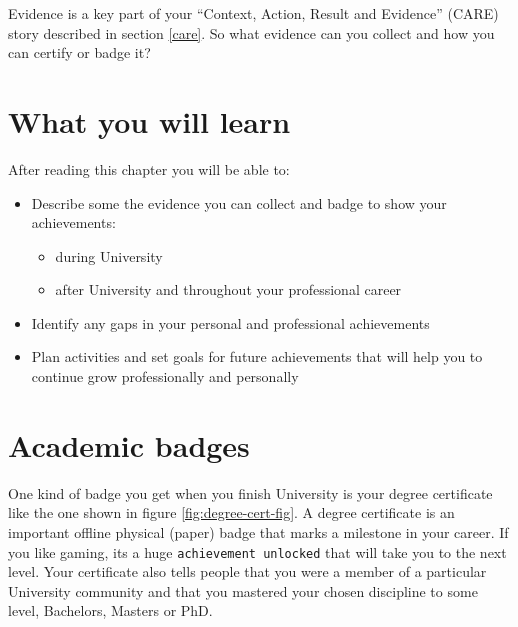 \documentclass[
]{book}
\providecommand{\tightlist}{%
  \setlength{\itemsep}{0pt}\setlength{\parskip}{0pt}}
\begin{document}
Evidence is a key part of your ``Context, Action, Result and Evidence'' (CARE) story described in section \ref{care}. So what evidence can you collect and how you can certify or badge it? 📛

\hypertarget{ilob}{%
\section{What you will learn}\label{ilob}}

After reading this chapter you will be able to:

\begin{itemize}
\tightlist
\item
  Describe some the evidence you can collect and badge to show your achievements:

  \begin{itemize}
  \tightlist
  \item
    during University
  \item
    after University and throughout your professional career
  \end{itemize}
\item
  Identify any gaps in your personal and professional achievements
\item
  Plan activities and set goals for future achievements that will help you to continue grow professionally and personally
\end{itemize}

\hypertarget{academentia}{%
\section{Academic badges}\label{academentia}}

One kind of badge you get when you finish University is your degree certificate like the one shown in figure \ref{fig:degree-cert-fig}. A degree certificate is an important offline physical (paper) badge that marks a milestone in your career. If you like gaming, its a huge \texttt{achievement\ unlocked} that will take you to the next level. Your certificate also tells people that you were a member of a particular University community and that you mastered your chosen discipline to some level, Bachelors, Masters or PhD.
\end{document}
